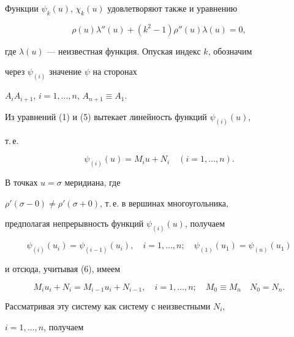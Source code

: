 Функции $\psi_k(u)$, $\chi_k(u)$ удовлетворяют также и уравнению


\begin{equation}


\rho(u)\lambda''(u)+(k^2-1)\rho''(u)\lambda(u)=0,


\end{equation}


где $\lambda(u)$ --- неизвестная функция. Опуская индекс $k$, обозначим


через $\psi_{(i)}$ значение $\psi$ на сторонах


$A_iA_{i+1}$, $i=1,\dotsc,n$, $A_{n+1}\equiv A_1$.





Из уравнений (1) и (5) вытекает линейность функций $\psi_{(i)}(u)$,


т.\,е.


\begin{equation}


\psi_{(i)}(u)=M_iu+N_i\quad (i=1,\dotsc,n).


\end{equation}


В точках $u=\sigma$ меридиана, где


$\rho'(\sigma-0)\ne\rho'(\sigma+0)$, т.\,е. в вершинах многоугольника,


предполагая непрерывность функций $\psi_{(i)}(u)$, получаем


\begin{equation}


\psi_{(i)}(u_i)=\psi_{(i-1)}(u_i),\quad i=1,\dotsc,n;\quad


\psi_{(1)}(u_1)=\psi_{(n)}(u_1)


\end{equation}


и отсюда, учитывая (6), имеем


\begin{equation}


M_iu_i+N_i=M_{i-1}u_i+N_{i-1},\quad i=1,\dotsc,n;\quad


M_0\equiv M_n\quad N_0=N_n.


\end{equation}


Рассматривая эту систему как систему с неизвестными $N_i$,


$i=1,\dotsc,n$, получаем


